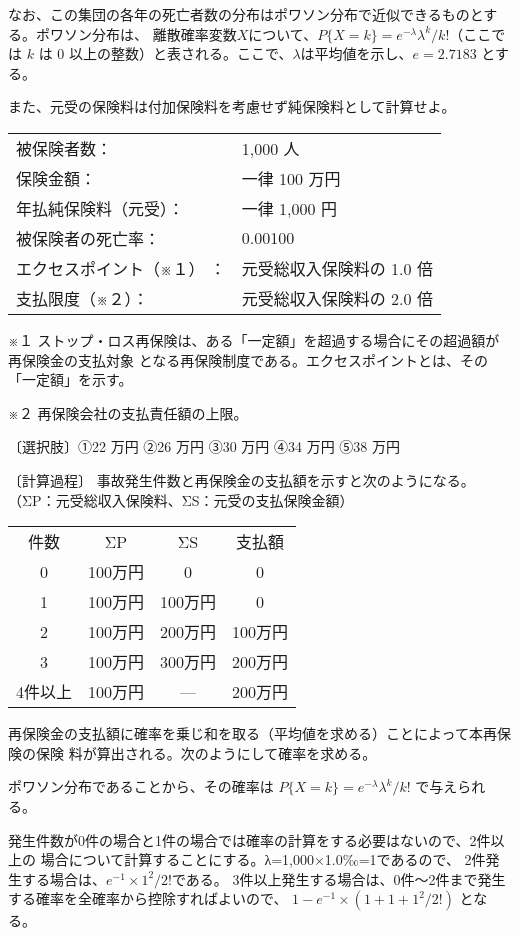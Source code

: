 \documentclass[report,gutter=10mm,fore-edge=10mm,uplatex,dvipdfmx]{jlreq}
\begin{document}
なお、この集団の各年の死亡者数の分布はポワソン分布で近似できるものとする。ポワソン分布は、
離散確率変数$X$について、$P\{X=k\}=e^{-\lambda}\lambda^k/k!$（ここでは $k$ は 0 以上の整数）と表される。ここで、$\lambda$は平均値を示し、$e=2.7183$ とする。

また、元受の保険料は付加保険料を考慮せず純保険料として計算せよ。

\vspace{1zh}
\begin{tabular}{ll}
被保険者数：&1,000 人\\
保険金額：&一律 100 万円\\
年払純保険料（元受）：&一律 1,000 円\\
被保険者の死亡率：&0.00100\\
エクセスポイント（※１） ：&元受総収入保険料の 1.0 倍\\
支払限度（※２）：&元受総収入保険料の 2.0 倍\\
\end{tabular}
\vspace{1zh}

※１ ストップ・ロス再保険は、ある「一定額」を超過する場合にその超過額が再保険金の支払対象
となる再保険制度である。エクセスポイントとは、その「一定額」を示す。

※２ 再保険会社の支払責任額の上限。

〔選択肢〕①22 万円 ②26 万円 ③30 万円 ④34 万円 ⑤38 万円

\answer{}

\noindent 〔計算過程〕
事故発生件数と再保険金の支払額を示すと次のようになる。（ΣP：元受総収入保険料、ΣS：元受の支払保険金額）

\begin{tabular}{cccc}
 件数& ΣP& ΣS&支払額\\
 0& 100万円& 0& 0\\
 1& 100万円& 100万円& 0\\
 2& 100万円& 200万円& 100万円\\
 3& 100万円& 300万円& 200万円\\
 4件以上& 100万円& --- & 200万円\\
\end{tabular}

再保険金の支払額に確率を乗じ和を取る（平均値を求める）ことによって本再保険の保険
料が算出される。次のようにして確率を求める。

ポワソン分布であることから、その確率は
$P\{X=k\}=e^{-\lambda}\lambda^k/k!$ で与えられる。

発生件数が0件の場合と1件の場合では確率の計算をする必要はないので、2件以上の
場合について計算することにする。λ=1,000×1.0‰=1であるので、
2件発生する場合は、$e^{-1}\times 1^2/2!$である。
3件以上発生する場合は、0件〜2件まで発生する確率を全確率から控除すればよいので、
$1−e^{-1}\times(1+1+1^2/2!)$ となる。
\end{document}
